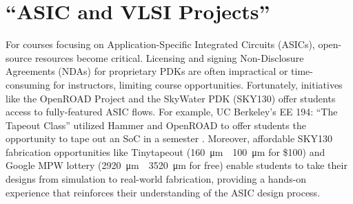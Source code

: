 \section{\enquote{ASIC and VLSI Projects}}

For courses focusing on Application-Specific Integrated Circuits (ASICs), open-source resources become critical. Licensing and signing Non-Disclosure Agreements (NDAs) for proprietary PDKs are often impractical or time-consuming for instructors, limiting course opportunities. Fortunately, initiatives like the OpenROAD Project and the SkyWater PDK (SKY130) offer students access to fully-featured ASIC flows. For example, UC Berkeley's EE 194: \enquote{The Tapeout Class} utilized Hammer and OpenROAD to offer students the opportunity to tape out an SoC in a semester \cite{ZhaoLatchUp}. Moreover, affordable SKY130 fabrication opportunities like Tinytapeout (\SI{160}{\micro\metre}~\texttimes~\SI{100}{\micro\metre} for \$100) \cite{tinytapeoutTinyTapeout} and Google MPW lottery (\SI{2920}{\micro\metre}~\texttimes~\SI{3520}{\micro\metre} for free) \cite{efablessCaravel} enable students to take their designs from simulation to real-world fabrication, providing a hands-on experience that reinforces their understanding of the ASIC design process.
